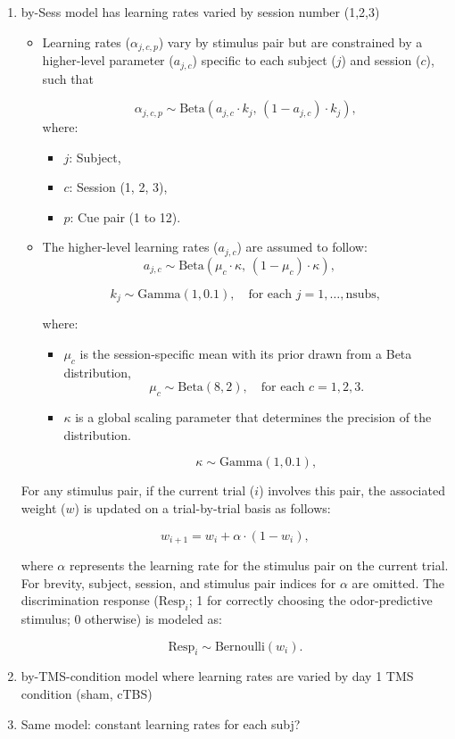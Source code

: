 \documentclass[a4paper,12pt]{article}
\begin{document}
\begin{enumerate}
    \item by-Sess model has learning rates varied by session number (1,2,3)

\begin{itemize}
    \item Learning rates (\(\alpha_{j,c,p}\)) vary by stimulus pair but are constrained by a higher-level parameter (\(a_{j,c}\)) specific to each subject (\(j\)) and session (\(c\)), such that
    
\[
\alpha_{j,c,p} \sim \text{Beta}\left(a_{j,c} \cdot k_j, \, (1 - a_{j,c}) \cdot k_j\right),
\]
    where:
    \begin{itemize}
        \item \(j\): Subject,
        \item \(c\): Session (1, 2, 3),
        \item \(p\): Cue pair (1 to 12).
    \end{itemize}

\item 
The higher-level learning rates (\(a_{j,c}\)) are assumed to follow:
\[
a_{j,c} \sim \text{Beta}\left(\mu_c \cdot \kappa, \, (1 - \mu_c) \cdot \kappa\right), \quad 
\]

\[
k_j \sim \text{Gamma}(1, 0.1), \quad \text{for each } j = 1, \dots, \text{nsubs},
\]

where:
\begin{itemize}
    \item \(\mu_c\) is the session-specific mean with its prior drawn from a Beta distribution,
    \[
\mu_c \sim \text{Beta}(8, 2), \quad \text{for each } c = 1, 2, 3.
\]

    \item \(\kappa\) is a global scaling parameter that determines the precision of the distribution.

    \[
\kappa \sim \text{Gamma}(1, 0.1),
\]

\end{itemize}

\end{itemize}


For any stimulus pair, if the current trial (\(i\)) involves this pair, the associated weight (\(w\)) is updated on a trial-by-trial basis as follows:

\[
w_{i+1} = w_{i} + \alpha \cdot (1 - w_{i}),
\]

where \(\alpha\) represents the learning rate for the stimulus pair on the current trial. For brevity, subject, session, and stimulus pair indices for \(\alpha\) are omitted. The discrimination response  (\(\text{Resp}_{i}\); 1 for correctly choosing the odor-predictive stimulus; 0 otherwise) is modeled as:

\[
\text{Resp}_{i} \sim \text{Bernoulli}(w_{i}).
\]



       
\item by-TMS-condition model where learning rates are varied by day 1 TMS condition (sham, cTBS)

    
\item Same model: constant learning rates for each subj?


\end{enumerate}
\end{document}
